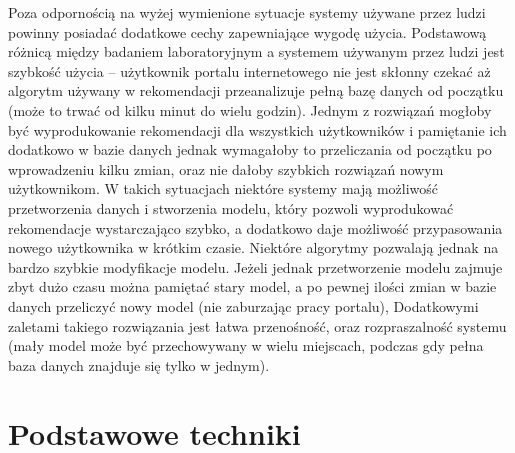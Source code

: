 \documentclass{pracamgr}
\begin{document}
   Poza odpornością na wyżej wymienione sytuacje systemy używane przez ludzi powinny posiadać dodatkowe cechy zapewniające wygodę użycia.
   Podstawową różnicą między badaniem laboratoryjnym a systemem używanym przez ludzi jest szybkość użycia --
   użytkownik portalu internetowego nie jest skłonny czekać aż algorytm używany w rekomendacji przeanalizuje pełną bazę danych od początku
   (może to trwać od kilku minut do wielu godzin).
   Jednym z rozwiązań mogłoby być wyprodukowanie rekomendacji dla wszystkich użytkowników i pamiętanie ich dodatkowo w bazie danych
   jednak wymagałoby to przeliczania od początku po wprowadzeniu kilku zmian, oraz nie dałoby szybkich rozwiązań nowym użytkownikom.
   W takich sytuacjach niektóre systemy mają możliwość przetworzenia danych i stworzenia modelu,
   który pozwoli wyprodukować rekomendacje wystarczająco szybko, a dodatkowo daje możliwość przypasowania nowego użytkownika w krótkim czasie.
   Niektóre algorytmy pozwalają jednak na bardzo szybkie modyfikacje modelu.
   Jeżeli jednak przetworzenie modelu zajmuje zbyt dużo czasu można pamiętać stary model,
   a po pewnej ilości zmian w bazie danych przeliczyć nowy model (nie zaburzając pracy portalu),
   Dodatkowymi zaletami takiego rozwiązania jest łatwa przenośność, oraz rozpraszalność systemu (mały model może być przechowywany w wielu miejscach,
   podczas gdy pełna baza danych znajduje się tylko w jednym).
   
   
   
   
   
   


 \chapter{Podstawowe techniki}
\end{document}
